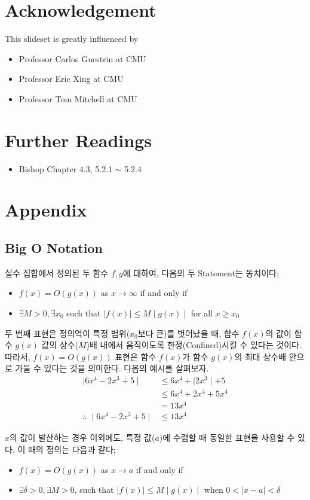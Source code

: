 \documentclass[a4paper]{oblivoir}
\begin{document}
\section*{Acknowledgement}
This slideset is greatly influenced by
\begin{itemize}\itemsep0pt
\item Professor Carlos Guestrin at CMU
\item Professor Eric Xing at CMU
\item Professor Tom Mitchell at CMU
\end{itemize}

\section*{Further Readings}
\begin{itemize}\itemsep0pt
\item Bishop Chapter 4.3, 5.2.1 $\sim$ 5.2.4 \end{itemize}

\section*{Appendix}
\subsection*{Big O Notation}
실수 집합에서 정의된 두 함수 $f,g$에 대하여, 다음의 두 Statement는 동치이다;
\begin{itemize}\setlength\itemsep{-\parsep}
\item $f(x)=O\left(g(x)\right)$ as $x \to \infty$ \: if and only if
\item $\exists M>0, \exists x_{0}$ such that $\mid f(x)\mid \leq M\mid g(x)\mid$ for all $x\geq x_{0}$
\end{itemize}

\indent 두 번째 표현은 정의역이 특정 범위($x_{0}$보다 큰)를 벗어났을 때, 함수 $f(x)$의 값이 함수 $g(x)$ 값의 상수($M$)배 내에서 움직이도록 한정(Confined)시킬 수 있다는 것이다. 따라서, $f(x)=O\left(g(x)\right)$ 표현은 함수 $f(x)$가 함수 $g(x)$의 최대 상수배 안으로 가둘 수 있다는 것을 의미한다. 다음의 예시를 살펴보자.
\begin{align*}
\mid 6x^{4} - 2x^{3} + 5\mid &\leq 6x^{4} + \mid 2x^{3}\mid + 5 \tag{4-A-1}\\
&\leq 6x^{4} + 2x^{4} + 5x^{4} \tag{4-A-2}\\
&=13x^{4} \tag{4-A-3}\\
\therefore \; \mid 6x^{4} - 2x^{3} + 5\mid &\leq 13x^{4} \tag{4-A-4}
\end{align*}

\indent $x$의 값이 발산하는 경우 이외에도, 특정 값($a$)에 수렴할 때 동일한 표현을 사용할 수 있다. 이 때의 정의는 다음과 같다;
\begin{itemize}\setlength\itemsep{-\parsep}
\item $f(x)=O\left(g(x)\right)$ as $x \to a$ \: if and only if
\item $\exists \delta>0, \exists M>0$, such that $\mid f(x)\mid \leq M\mid g(x)\mid$ when $0<\mid x-a \mid < \delta$
\end{itemize}
\end{document}

